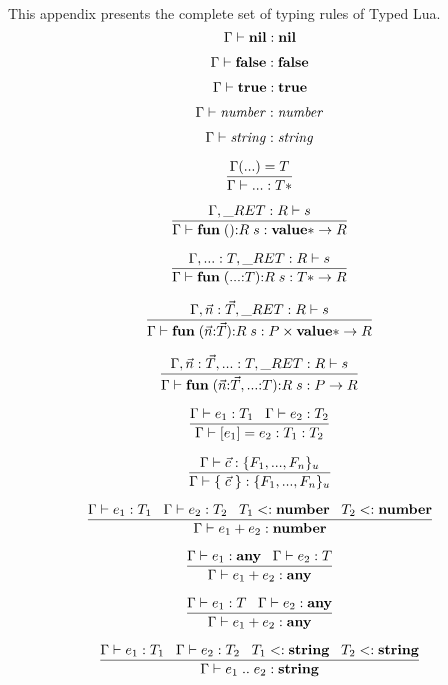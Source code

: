 This appendix presents the complete set of typing rules of Typed Lua.
\\

\[
\Gamma \vdash \mathbf{nil}:\mathbf{nil}
\]

\[
\Gamma \vdash \mathbf{false}:\mathbf{false}
\]

\[
\Gamma \vdash \mathbf{true}:\mathbf{true}
\]

\[
\Gamma \vdash {\it number}:{\it number}
\]

\[
\Gamma \vdash {\it string}:{\it string}
\]

\[
\dfrac{\Gamma({...}) = T}
      {\Gamma \vdash {...}:T{*}}
\]

\[
\dfrac{\env, \ret:R \vdash s}
      {\env \vdash \mathbf{fun} \; (){:}R \; s:\Value{*} \rightarrow R}
\]

\[
\dfrac{\env, {...}:T, \ret:R \vdash s}
      {\env \vdash \mathbf{fun} \; ({...}{:}T){:}R \; s:T{*} \rightarrow R}
\]

\[
\dfrac{\env, \vec{n}:\vec{T}, \ret:R \vdash s}
      {\env \vdash \mathbf{fun} \; (\vec{n}{:}\vec{T}){:}R \; s:P \times \Value{*} \rightarrow R}
\]

\[
\dfrac{\env, \vec{n}:\vec{T}, {...}:T, \ret:R \vdash s}
      {\env \vdash \mathbf{fun} \; (\vec{n}{:}\vec{T},{...}{:}T){:}R \; s:P \rightarrow R}
\]

\[
\dfrac{\Gamma \vdash e_{1}:T_{1} \;\;\;
       \Gamma \vdash e_{2}:T_{2}}
      {\Gamma \vdash [e_{1}] = e_{2}:T_{1}:T_{2}}
\]

\[
\dfrac{\Gamma \vdash \vec{c}:\{ F_{1}, ..., F_{n} \}_{u}}
      {\Gamma \vdash \{ \; \vec{c} \; \}:\{ F_{1}, ..., F_{n} \}_{u}}
\]

\[
\dfrac{\Gamma \vdash e_{1}:T_{1} \;\;\;
       \Gamma \vdash e_{2}:T_{2} \;\;\;
       T_{1} <: \mathbf{number} \;\;\;
       T_{2} <: \mathbf{number}}
      {\Gamma \vdash e_{1} + e_{2}:\mathbf{number}}
\]

\[
\dfrac{\Gamma \vdash e_{1}:\mathbf{any} \;\;\;
       \Gamma \vdash e_{2}:T}
      {\Gamma \vdash e_{1} + e_{2}:\mathbf{any}}
\]

\[
\dfrac{\Gamma \vdash e_{1}:T \;\;\;
       \Gamma \vdash e_{2}:\mathbf{any}}
      {\Gamma \vdash e_{1} + e_{2}:\mathbf{any}}
\]

\[
\dfrac{\Gamma \vdash e_{1}:T_{1} \;\;\;
       \Gamma \vdash e_{2}:T_{2} \;\;\;
       T_{1} <: \mathbf{string} \;\;\;
       T_{2} <: \mathbf{string}}
      {\Gamma \vdash e_{1} \; {..} \; e_{2}:\mathbf{string}}
\]

